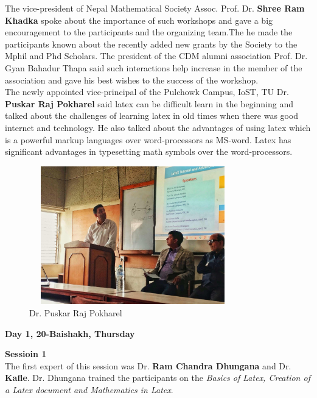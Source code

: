 \documentclass[a4paper,12pt]{report}
\begin{document}
\noindent
The vice-president of Nepal Mathematical Society Assoc. Prof. Dr. \textbf{Shree Ram Khadka} spoke about the importance of such workshops and gave a big encouragement to the participants and the organizing team.The he made the participants known about the recently added new grants by the Society to the Mphil and Phd Scholars. The president of the CDM alumni association Prof. Dr. {Gyan Bahadur Thapa} said such interactions help increase in the member of the association and gave his best wishes to the success of the workshop.\\[3mm]

The newly appointed vice-principal of the Pulchowk Campus, IoST, TU Dr.\textbf{ Puskar Raj Pokharel} said latex can be difficult learn in the beginning and talked about the challenges of learning latex in old times when there was good internet and technology. He also talked about the advantages of using latex which is a powerful markup languages over word-processors as MS-word. Latex has significant advantages in typesetting math symbols over the word-processors.

\begin{figure}[h!]
  \centering
  \includegraphics[height=6cm, width=9cm]{puskarsir2.jpg}
  \caption{Dr. Puskar Raj Pokharel}
\end{figure}
\clearpage

\begin{center}
  {\bfseries \Large Day 1, 20-Baishakh, Thursday}
\end{center}
\vspace{3mm}

{\bfseries \large Sessioin 1}\\[3mm]
The first expert of this session was Dr. \textbf{Ram Chandra Dhungana} and Dr. \textbf{Kafle}. Dr. Dhungana trained the participants on the \textit{Basics of Latex, Creation of a Latex document and Mathematics in Latex}.
\vspace{3mm}
\end{document}

